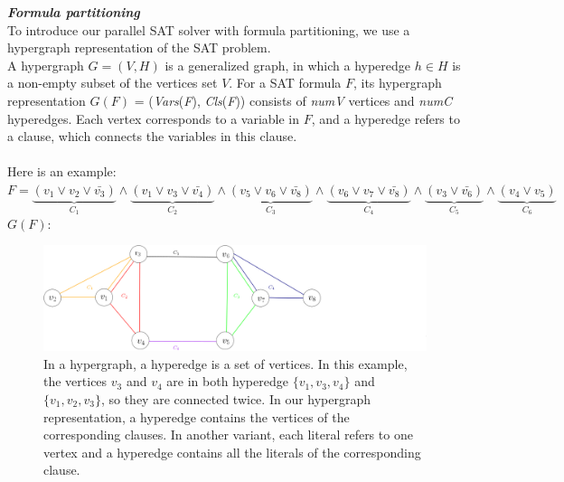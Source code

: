 \documentclass[12pt,a4paper,twoside]{scrartcl}
\numberwithin{equation}{section}
\begin{document}
\emph{\textbf{Formula partitioning}}\\
To introduce our parallel SAT solver with formula partitioning, we use a  hypergraph representation of the SAT problem. \\
A hypergraph $G = (V,H)$ is a generalized graph, in which a hyperedge $h \in H$ is a non-empty subset of the vertices set $V$. For a SAT formula $F$, its hypergraph representation $G(F)$ = (\emph{Vars}(\emph{F}), \emph{Cls}(\emph{F})) consists of \emph{numV} vertices and \emph{numC} hyperedges. 
  Each vertex corresponds to a variable in $F$, and a hyperedge refers to a clause, which connects the variables in this clause. \\
\\
Here is an example:\\
$F =\underbrace{(v_1 \lor v_2 \lor \bar{v_3})}_\text{$C_1$} \land \underbrace{(v_1 \lor v_3\lor \bar{v_4})}_\text{$C_2$}\land \underbrace{(v_5 \lor v_6\lor \bar{v_8})}_\text{$C_3$}\land \underbrace{(v_6 \lor v_7\lor \bar{v_8})}_\text{$C_4$}\land \underbrace{(v_3\lor \bar{v_6})}_\text{$C_5$}\land \underbrace{(v_4 \lor v_5)}_\text{$C_6$}$\\
$G(F)$:
\begin{figure}[H]
\begin{center}
  \includegraphics[scale = 0.4]{1/hypergraph.png}
  \end{center}
  \caption{In a hypergraph, a hyperedge is a set of vertices. In this example, the vertices  $v_3$  and $v_4$ are in both hyperedge $\{v_1, v_3, v_4\}$ and $\{v_1, v_2, v_3\}$, so they are connected twice. In our hypergraph representation, a hyperedge contains the vertices of the corresponding clauses. In another variant, each literal refers to one vertex and a hyperedge contains all the literals of the corresponding clause.}
  \label{hypergraph representation}
  \end{figure}
\end{document}

